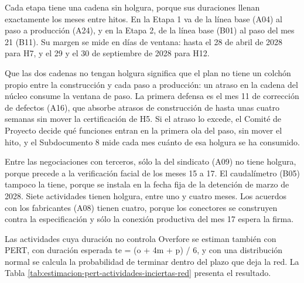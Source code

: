 \documentclass[subdoc]{../../comun/overfore}
\begin{document}
Cada etapa tiene una cadena sin holgura, porque sus duraciones llenan exactamente los meses entre hitos. En la Etapa 1 va de la línea base (A04) al paso a producción (A24), y en la Etapa 2, de la línea base (B01) al paso del mes 21 (B11). Su margen se mide en días de ventana: hasta el 28 de abril de 2028 para H7, y el 29 y el 30 de septiembre de 2028 para H12.

Que las dos cadenas no tengan holgura significa que el plan no tiene un colchón propio entre la construcción y cada paso a producción: un atraso en la cadena del núcleo consume la ventana de paso. La primera defensa es el mes 11 de corrección de defectos (A16), que absorbe atrasos de construcción de hasta unas cuatro semanas sin mover la certificación de H5. Si el atraso lo excede, el Comité de Proyecto decide qué funciones entran en la primera ola del paso, sin mover el hito, y el Subdocumento 8 mide cada mes cuánto de esa holgura se ha consumido.

Entre las negociaciones con terceros, sólo la del sindicato (A09) no tiene holgura, porque precede a la verificación facial de los meses 15 a 17. El caudalímetro (B05) tampoco la tiene, porque se instala en la fecha fija de la detención de marzo de 2028. Siete actividades tienen holgura, entre uno y cuatro meses. Los acuerdos con los fabricantes (A08) tienen cuatro, porque los conectores se construyen contra la especificación y sólo la conexión productiva del mes 17 espera la firma.

Las actividades cuya duración no controla Overfore se estiman también con PERT, con duración esperada te = (o + 4m + p) / 6, y con una distribución normal se calcula la probabilidad de terminar dentro del plazo que deja la red. La Tabla \ref{tab:estimacion-pert-actividades-inciertas-red} presenta el resultado.
\end{document}
